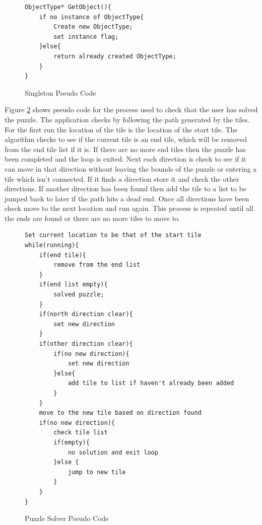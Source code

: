 \begin{figure}[h|]
\centering
\begin{lstlisting}
ObjectType* GetObject(){
	if no instance of ObjectType{
		Create new ObjectType;
		set instance flag;
	}else{
		return already created ObjectType;
	}
}
\end{lstlisting}
\caption{Singleton Pseudo Code}
\label{sc:singleton_pattern}
\end{figure}

Figure \ref{sc:puzzle solver} shows pseudo code for the process used to check that the user has solved the puzzle.
The application checks by following the path generated by the tiles. For the first run the location of the tile is the location of the start tile.
The algorithm checks to see if the current tile is an end tile, which will be removed from the end tile list if it is.
If there are no more end tiles then the puzzle has been completed and the loop is exited.
Next each direction is check to see if it can move in that direction without leaving the bounds of the puzzle or entering a tile which isn't connected.
If it finds a direction store it and check the other directions.
If another direction has been found then add the tile to a list to be jumped back to later if the path hits a dead end. Once all directions have been check move to the next location and run again.
This process is repeated until all the ends are found or there are no more tiles to move to.

\begin{figure}[h|]
\centering
\begin{lstlisting}
Set current location to be that of the start tile
while(running){
	if(end tile){
		remove from the end list
	}
	if(end list empty){
		solved puzzle;
	}
	if(north direction clear){
		set new direction
	}
	if(other direction clear){
		if(no new direction){
			set new direction
		}else{
			add tile to list if haven't already been added
		}
	}
	move to the new tile based on direction found
	if(no new direction){
		check tile list
		if(empty){
			no solution and exit loop
		}else {
			jump to new tile
		}
	}
}
\end{lstlisting}
\caption{Puzzle Solver Pseudo Code}
\label{sc:puzzle solver}
\end{figure}
